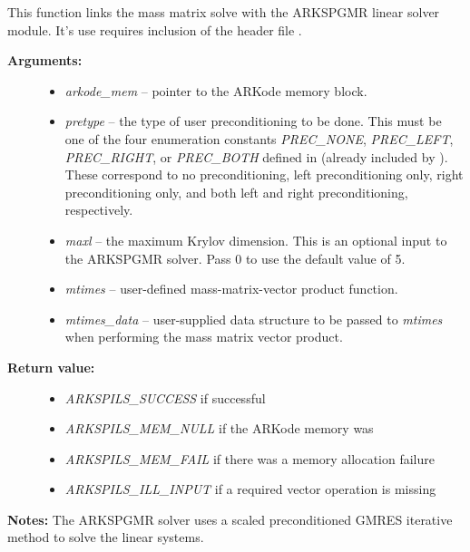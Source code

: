 \documentclass[letterpaper,10pt,english]{sphinxmanual}
\begin{document}

\begin{fulllineitems}
\label{c_interface/User_callable:c.ARKMassSpgmr}
This function links the mass matrix solve with the ARKSPGMR linear
solver module.  It's use requires inclusion of the header file
.
\begin{description}
\item[{\textbf{Arguments:}}] \leavevmode\begin{itemize}
\item {} 
\emph{arkode\_mem} -- pointer to the ARKode memory block.

\item {} 
\emph{pretype} -- the type of user preconditioning to be done.  This
must be one of the four enumeration constants \emph{PREC\_NONE},
\emph{PREC\_LEFT}, \emph{PREC\_RIGHT}, or \emph{PREC\_BOTH} defined in
 (already included by
). These correspond to no preconditioning,
left preconditioning only, right preconditioning only, and
both left and right preconditioning, respectively.

\item {} 
\emph{maxl} -- the maximum Krylov dimension. This is an optional input
to the ARKSPGMR solver. Pass 0 to use the default value of 5.

\item {} 
\emph{mtimes} -- user-defined mass-matrix-vector product function.

\item {} 
\emph{mtimes\_data} -- user-supplied data structure to be passed
to \emph{mtimes} when performing the mass matrix vector product.

\end{itemize}

\item[{\textbf{Return value:}}] \leavevmode\begin{itemize}
\item {} 
\emph{ARKSPILS\_SUCCESS} if successful

\item {} 
\emph{ARKSPILS\_MEM\_NULL}  if the ARKode memory was 

\item {} 
\emph{ARKSPILS\_MEM\_FAIL}  if there was a memory allocation failure

\item {} 
\emph{ARKSPILS\_ILL\_INPUT} if a required vector operation is missing

\end{itemize}

\end{description}

\textbf{Notes:} The ARKSPGMR solver uses a scaled preconditioned GMRES
iterative method to solve the linear systems.

\end{fulllineitems}
\end{document}
